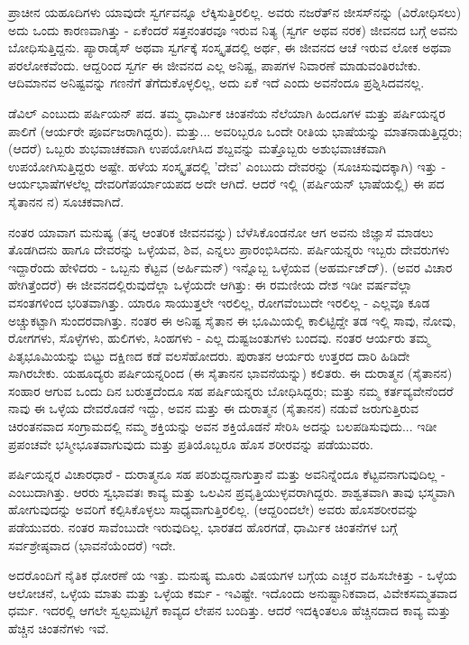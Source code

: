 ಪ್ರಾಚೀನ ಯಹೂದಿಗಳು ಯಾವುದೇ ಸ್ವರ್ಗವನ್ನೂ ಲೆಕ್ಕಿಸುತ್ತಿರಲಿಲ್ಲ. ಅವರು ನಜರೆತ್‌ನ ಜೀಸಸ್‌ನನ್ನು (ವಿರೋಧಿಸಲು) ಅದು ಒಂದು ಕಾರಣವಾಗಿತ್ತು - ಏಕೆಂದರೆ ಸತ್ತನಂತರವೂ ಇರುವ ನಿತ್ಯ (ಸ್ವರ್ಗ ಅಥವ ನರಕ) ಜೀವನದ ಬಗ್ಗೆ ಅವನು ಬೋಧಿಸುತ್ತಿದ್ದನು. ಪ್ಯಾರಾಡೈಸ್ ಅಥವಾ ಸ್ವರ್ಗಕ್ಕೆ ಸಂಸ್ಕೃತದಲ್ಲಿ ಅರ್ಥ, ಈ ಜೀವನದ ಆಚೆ ಇರುವ ಲೋಕ ಅಥವಾ ಪರಲೋಕವೆಂದು. ಆದ್ದರಿಂದ ಸ್ವರ್ಗ ಈ ಜೀವನದ ಎಲ್ಲ ಅನಿಷ್ಟ, ಪಾಪಗಳ ನಿವಾರಣೆ ಮಾಡುವಂತಿರಬೇಕು. ಆದಿಮಾನವ ಅನಿಷ್ಟವನ್ನು ಗಣನೆಗೆ ತೆಗೆದುಕೊಳ್ಳಲಿಲ್ಲ, ಅದು ಏಕೆ ಇದೆ ಎಂದು ಅವನೆಂದೂ ಪ್ರಶ್ನಿಸಿದವನಲ್ಲ.

ಡೆವಿಲ್ ಎಂಬುದು ಪರ್ಷಿಯನ್ ಪದ. ತಮ್ಮ ಧಾರ್ಮಿಕ ಚಿಂತನೆಯ ನೆಲೆಯಾಗಿ ಹಿಂದೂಗಳ ಮತ್ತು ಪರ್ಷಿಯನ್ನರ ಪಾಲಿಗೆ (ಆರ್ಯರೇ ಪೂರ್ವಜರಾಗಿದ್ದರು). ಮತ್ತು... ಅವರಿಬ್ಬರೂ ಒಂದೇ ರೀತಿಯ ಭಾಷೆಯನ್ನು ಮಾತನಾಡುತ್ತಿದ್ದರು; (ಆದರೆ) ಒಬ್ಬರು ಶುಭವಾಚಕವಾಗಿ ಉಪಯೋಗಿಸಿದ ಶಬ್ದವನ್ನು ಮತ್ತೊಬ್ಬರು ಅಶುಭವಾಚಕವಾಗಿ ಉಪಯೋಗಿಸುತ್ತಿದ್ದರು ಅಷ್ಟೇ. ಹಳೆಯ ಸಂಸ್ಕೃತದಲ್ಲಿ 'ದೇವ' ಎಂಬುದು ದೇವರನ್ನು (ಸೂಚಿಸುವುದಕ್ಕಾಗಿ) ಇತ್ತು - ಆರ್ಯಭಾಷೆಗಳಲೆಲ್ಲ ದೇವರಿಗೆ\break ಪರ್ಯಾಯಪದ ಅದೇ ಆಗಿದೆ. ಆದರೆ ಇಲ್ಲಿ (ಪರ್ಷಿಯನ್ ಭಾಷೆಯಲ್ಲಿ) ಈ ಪದ ಸೈತಾನನ ನ) ಸೂಚಕವಾಗಿದೆ.

ನಂತರ ಯಾವಾಗ ಮನುಷ್ಯ (ತನ್ನ ಆಂತರಿಕ ಜೀವನವನ್ನು) ಬೆಳೆಸಿಕೊಂಡನೋ ಆಗ ಅವನು ಜಿಜ್ಞಾಸೆ ಮಾಡಲು ತೊಡಗಿದನು ಹಾಗೂ ದೇವರನ್ನು ಒಳ್ಳೆಯವ, ಶಿವ, ಎನ್ನಲು ಪ್ರಾರಂಭಿಸಿದನು. ಪರ್ಷಿಯನ್ನರು ಇಬ್ಬರು ದೇವರುಗಳು ಇದ್ದಾರೆಂದು ಹೇಳಿದರು - ಒಬ್ಬನು ಕೆಟ್ಟವ (ಅರ್ಹಿಮನ್‌) ಇನ್ನೊಬ್ಬ ಒಳ್ಳೆಯವ (ಅಹರ್ಮಜ್‌ದ್). (ಅವರ ವಿಚಾರ ಹೇಗಿತ್ತೆಂದರೆ) ಈ ಜೀವನದಲ್ಲಿರುವುದೆಲ್ಲಾ ಒಳ್ಳೆಯದೇ ಆಗಿತ್ತು: ಈ ರಮಣೀಯ ದೇಶ ಇಡೀ ವರ್ಷವೆಲ್ಲಾ ವಸಂತಗಳಿಂದ ಭರಿತವಾಗಿತ್ತು. ಯಾರೂ ಸಾಯುತ್ತಲೇ ಇರಲಿಲ್ಲ, ರೋಗವೆಂಬುದೇ ಇರಲಿಲ್ಲ - ಎಲ್ಲವೂ ಕೂಡ ಅಚ್ಚುಕಟ್ಟಾಗಿ ಸುಂದರವಾಗಿತ್ತು. ನಂತರ ಈ ಅನಿಷ್ಟ ಸೈತಾನ ಈ ಭೂಮಿಯಲ್ಲಿ ಕಾಲಿಟ್ಟಿದ್ದೇ ತಡ ಇಲ್ಲಿ ಸಾವು, ನೋವು, ರೋಗಗಳು, ಸೊಳ್ಳೆಗಳು, ಹುಲಿಗಳು, ಸಿಂಹಗಳು - ಎಲ್ಲ ದುಷ್ಟಜಂತುಗಳು ಬಂದವು. ನಂತರ ಆರ್ಯರು ತಮ್ಮ ಪಿತೃಭೂಮಿಯನ್ನು ಬಿಟ್ಟು ದಕ್ಷಿಣದ ಕಡೆ ವಲಸೆಹೋದರು. ಪುರಾತನ ಆರ್ಯರು ಉತ್ತರದ ದಾರಿ ಹಿಡಿದೇ ಸಾಗಿರಬೇಕು. ಯಹೂದ್ಯರು ಪರ್ಷಿಯನ್ನರಿಂದ (ಈ ಸೈತಾನನ ಭಾವನೆಯನ್ನು) ಕಲಿತರು. ಈ ದುರಾತ್ಮನ (ಸೈತಾನನ) ಸಂಹಾರ ಆಗುವ ಒಂದು ದಿನ ಬರುತ್ತದೆಂದೂ ಸಹ ಪರ್ಷಿಯನ್ನರು ಬೋಧಿಸಿದ್ದರು; ಮತ್ತು ನಮ್ಮ ಕರ್ತವ್ಯವೇನೆಂದರೆ ನಾವು ಈ ಒಳ್ಳೆಯ ದೇವರೊಡನೆ ಇದ್ದು, ಅವನ ಮತ್ತು ಈ ದುರಾತ್ಮನ (ಸೈತಾನನ) ನಡುವೆ ಜರುಗುತ್ತಿರುವ ಚಿರಂತನವಾದ ಸಂಗ್ರಾಮದಲ್ಲಿ ನಮ್ಮ ಶಕ್ತಿಯನ್ನು ಅವನ ಶಕ್ತಿಯೊಡನೆ ಸೇರಿಸಿ ಅದನ್ನು ಬಲಪಡಿಸುವುದು... ಇಡೀ ಪ್ರಪಂಚವೇ ಭಸ್ಮೀಭೂತವಾಗುವುದು ಮತ್ತು ಪ್ರತಿಯೊಬ್ಬರೂ ಹೊಸ ಶರೀರವನ್ನು ಪಡೆಯುವರು.

ಪರ್ಷಿಯನ್ನರ ವಿಚಾರಧಾರೆ - ದುರಾತ್ಮನೂ ಸಹ ಪರಿಶುದ್ದನಾಗುತ್ತಾನೆ ಮತ್ತು ಅವನಿನ್ನೆಂದೂ ಕೆಟ್ಟವನಾಗುವುದಿಲ್ಲ - ಎಂಬುದಾಗಿತ್ತು. ಆರರು ಸ್ವಭಾವತಃ ಕಾವ್ಯ ಮತ್ತು ಒಲವಿನ ಪ್ರವೃತ್ತಿಯುಳ್ಳವರಾಗಿದ್ದರು. ಶಾಶ್ವತವಾಗಿ ತಾವು ಭಸ್ಮವಾಗಿ ಹೋಗುವುದನ್ನು ಅವರಿಗೆ ಕಲ್ಪಿಸಿಕೊಳ್ಳಲು ಸಾಧ್ಯವಾಗುತ್ತಿರಲಿಲ್ಲ. (ಆದ್ದರಿಂದಲೇ) ಅವರು ಹೊಸ\break ಶರೀರವನ್ನು ಪಡೆಯುವರು. ನಂತರ ಸಾವೆಂಬುದೇ ಇರುವುದಿಲ್ಲ. ಭಾರತದ ಹೊರಗಡೆ, ಧಾರ್ಮಿಕ ಚಿಂತನೆಗಳ ಬಗ್ಗೆ ಸರ್ವಶ್ರೇಷ್ಠವಾದ (ಭಾವನೆಯೆಂದರೆ) ಇದೇ.

ಅದರೊಂದಿಗೆ ನೈತಿಕ ಧೋರಣೆ ಯ ಇತ್ತು. ಮನುಷ್ಯ ಮೂರು ವಿಷಯಗಳ ಬಗ್ಗೆಯ ಎಚ್ಚರ ವಹಿಸಬೇಕಿತ್ತು - ಒಳ್ಳೆಯ ಆಲೋಚನೆ, ಒಳ್ಳೆಯ ಮಾತು ಮತ್ತು ಒಳ್ಳೆಯ ಕರ್ಮ - ಇವಿಷ್ಟೇ. ಇದೊಂದು ಅನುಷ್ಟಾನಿಕವಾದ, ವಿವೇಕಸಮ್ಮತವಾದ ಧರ್ಮ. ಇದರಲ್ಲಿ ಆಗಲೇ ಸ್ವಲ್ಪಮಟ್ಟಿಗೆ ಕಾವ್ಯದ ಲೇಪನ ಬಂದಿತ್ತು. ಆದರೆ ಇದಕ್ಕಿಂತಲೂ ಹೆಚ್ಚಿನದಾದ ಕಾವ್ಯ ಮತ್ತು ಹೆಚ್ಚಿನ ಚಿಂತನೆಗಳು ಇವೆ.

